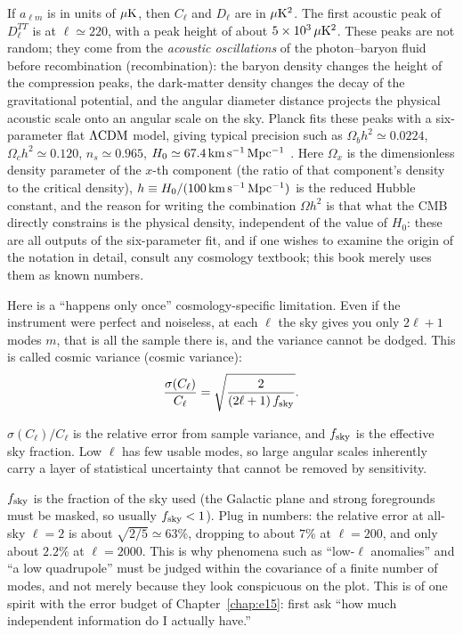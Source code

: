 If \(a_{\ell m}\) is in units of \(\mu{\rm K}\), then \(C_\ell\) and \(D_\ell\) are in \(\mu{\rm K}^2\). The first acoustic peak of \(D^{TT}_\ell\) is at \(\ell\simeq220\), with a peak height of about \(5\times10^3\,\mu{\rm K}^2\). These peaks are not random; they come from the \emph{acoustic oscillations} of the photon--baryon fluid before recombination (recombination): the baryon density changes the height of the compression peaks, the dark-matter density changes the decay of the gravitational potential, and the angular diameter distance projects the physical acoustic scale onto an angular scale on the sky. Planck fits these peaks with a six-parameter flat \(\Lambda{\rm CDM}\) model, giving typical precision such as \(\Omega_bh^2\simeq0.0224\), \(\Omega_ch^2\simeq0.120\), \(n_s\simeq0.965\), \(H_0\simeq67.4\,{\rm km\,s^{-1}\,Mpc^{-1}}\) \citep{1992ApJ...396L...1S,1996ApJ...469..437S,2020A&A...641A...5P,2020A&A...641A...6P}. Here \(\Omega_x\) is the dimensionless density parameter of the \(x\)-th component (the ratio of that component's density to the critical density), \(h\equiv H_0/(100\,{\rm km\,s^{-1}\,Mpc^{-1}})\) is the reduced Hubble constant, and the reason for writing the combination \(\Omega h^2\) is that what the CMB directly constrains is the physical density, independent of the value of \(H_0\): these are all outputs of the six-parameter fit, and if one wishes to examine the origin of the notation in detail, consult any cosmology textbook; this book merely uses them as known numbers.

Here is a ``happens only once'' cosmology-specific limitation. Even if the instrument were perfect and noiseless, at each \(\ell\) the sky gives you only \(2\ell+1\) modes \(m\), that is all the sample there is, and the variance cannot be dodged. This is called cosmic variance (cosmic variance):
\begin{equation}
  \frac{\sigma(C_\ell)}{C_\ell}=\sqrt{\frac{2}{(2\ell+1)\,f_{\rm sky}}} .
  \label{eq:e23-cosmic-variance}
\end{equation}
\begin{formulaexplain}
\(\sigma(C_\ell)/C_\ell\) is the relative error from sample variance, and \(f_{\rm sky}\) is the effective sky fraction. Low \(\ell\) has few usable modes, so large angular scales inherently carry a layer of statistical uncertainty that cannot be removed by sensitivity.
\end{formulaexplain}
\(f_{\rm sky}\) is the fraction of the sky used (the Galactic plane and strong foregrounds must be masked, so usually \(f_{\rm sky}<1\)). Plug in numbers: the relative error at all-sky \(\ell=2\) is about \(\sqrt{2/5}\simeq63\%\), dropping to about \(7\%\) at \(\ell=200\), and only about \(2.2\%\) at \(\ell=2000\). This is why phenomena such as ``low-\(\ell\) anomalies'' and ``a low quadrupole'' must be judged within the covariance of a finite number of modes, and not merely because they look conspicuous on the plot. This is of one spirit with the error budget of Chapter~\ref{chap:e15}: first ask ``how much independent information do I actually have.''

